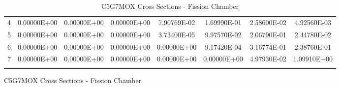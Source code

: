 \begin{figure}
\begin{table}[H]
\begin{subtable}[h]{1.0\textwidth}
{\begin{tabular}{*8c}
4 &	0.00000E+00 &	0.00000E+00 &	0.00000E+00 &	7.90769E-02 &	1.69990E-01 &	2.58600E-02 &	4.92560E-03 \\
5 &	0.00000E+00 &	0.00000E+00 &	0.00000E+00 &	3.73400E-05 &	9.97570E-02 &	2.06790E-01 &	2.44780E-02 \\
6 &	0.00000E+00 &	0.00000E+00 &	0.00000E+00 &	0.00000E+00 &	9.17420E-04 &	3.16774E-01 &	2.38760E-01 \\
7 &	0.00000E+00 &	0.00000E+00 &	0.00000E+00 &	0.00000E+00 &	0.00000E+00 &	4.97930E-02 &	1.09910E+00 \\
        \bottomrule
        & & & & & & & 
    \end{tabular}}
  \end{subtable}
  \caption{C5G7MOX Cross Sections - Fission Chamber}
\end{table}
\end{figure}

